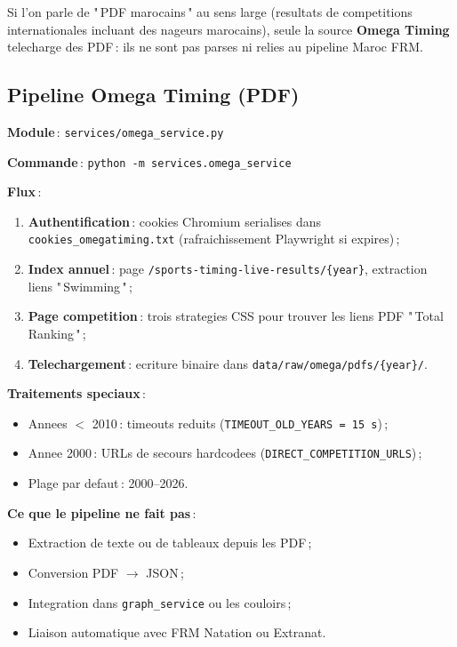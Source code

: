 \documentclass[11pt,a4paper]{article}
\begin{document}
Si l'on parle de "\,PDF marocains\," au sens large (resultats de competitions internationales incluant des nageurs marocains), seule la source \textbf{Omega Timing} telecharge des PDF\,: ils ne sont pas parses ni relies au pipeline Maroc FRM.

\subsection{Pipeline Omega Timing (PDF)}

\textbf{Module}\,: \texttt{services/omega\_service.py}

\textbf{Commande}\,: \texttt{python -m services.omega\_service}

\textbf{Flux}\,:
\begin{enumerate}
  \item \textbf{Authentification}\,: cookies Chromium serialises dans \texttt{cookies\_omegatiming.txt} (rafraichissement Playwright si expires)\,;
  \item \textbf{Index annuel}\,: page \texttt{/sports-timing-live-results/\{year\}}, extraction liens "\,Swimming\,"\,;
  \item \textbf{Page competition}\,: trois strategies CSS pour trouver les liens PDF "\,Total Ranking\,"\,;
  \item \textbf{Telechargement}\,: ecriture binaire dans \texttt{data/raw/omega/pdfs/\{year\}/}.
\end{enumerate}

\textbf{Traitements speciaux}\,:
\begin{itemize}
  \item Annees $<$ 2010\,: timeouts reduits (\texttt{TIMEOUT\_OLD\_YEARS = 15\,s})\,;
  \item Annee 2000\,: URLs de secours hardcodees (\texttt{DIRECT\_COMPETITION\_URLS})\,;
  \item Plage par defaut\,: 2000--2026.
\end{itemize}

\textbf{Ce que le pipeline ne fait pas}\,:
\begin{itemize}
  \item Extraction de texte ou de tableaux depuis les PDF\,;
  \item Conversion PDF $\rightarrow$ JSON\,;
  \item Integration dans \texttt{graph\_service} ou les couloirs\,;
  \item Liaison automatique avec FRM Natation ou Extranat.
\end{itemize}
\end{document}
